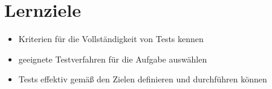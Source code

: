\section{Lernziele}

\begin{itemize}
    \item Kriterien für die Vollständigkeit von Tests kennen
    \item geeignete Testverfahren für die Aufgabe auswählen
    \item Tests effektiv gemäß den Zielen definieren und durchführen können
\end{itemize}
